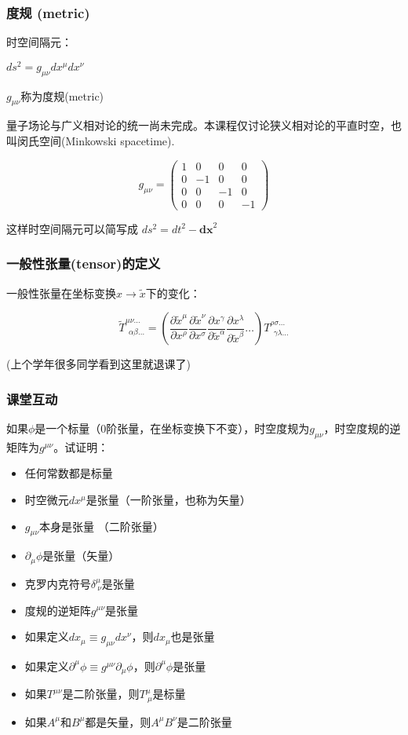 \documentclass[CJK]{beamer}
\begin{document}
\begin{frame}
\frametitle{\bch 度规 (metric) \ech}
\bch 时空间隔元：\ech

$ds^2 = g_{\mu\nu} dx^\mu dx^\nu$

\bch $g_{\mu\nu}$称为度规(metric) \ech

{\vskip 0.1in}

\bch 量子场论与广义相对论的统一尚未完成。本课程仅讨论狭义相对论的平直时空，也叫闵氏空间(Minkowski spacetime). \ech

\begin{equation} 
g_{\mu\nu} =  \left( \begin{array}{rrrr} 1 & 0 & 0 & 0 \\ 0 & -1 & 0 & 0 \\ 0 & 0 & -1 & 0 \\ 0 & 0 & 0 & -1 \end{array} \right) \nonumber
\end{equation}

\bch 这样时空间隔元可以简写成 $ds^2 = dt^2 - \mathbf{dx}^2$ \ech

\end{frame}


\begin{frame}
\frametitle{\bch 一般性张量(tensor)的定义 \ech}
\bch
一般性张量在坐标变换$x \rightarrow \tilde{x}$下的变化：


$$\tilde{T}^{\mu\nu\ldots}_{\ \ \alpha\beta\ldots} = \left(\frac{\partial \tilde{x}^\mu}{\partial x^\rho}\frac{\partial \tilde{x}^\nu}{\partial x^\sigma} \frac{\partial x^\gamma }{\partial \tilde{x}^\alpha}\frac{\partial x^\lambda}{\partial \tilde{x}^\beta} \ldots \right)T^{\rho\sigma\ldots}_{\ \ \gamma\lambda\ldots} $$

\skiplines


(上个学年很多同学看到这里就退课了\bye)
\ech
\end{frame}

\begin{frame}
\frametitle{\bch 课堂互动 \ech}
\bch
如果$\phi$是一个标量（0阶张量，在坐标变换下不变），时空度规为$g_{\mu\nu}$，时空度规的逆矩阵为$g^{\mu\nu}$。试证明：
\begin{itemize}
\item{任何常数都是标量}
\item{时空微元$dx^\mu$是张量（一阶张量，也称为矢量）}
\item{$g_{\mu\nu}$本身是张量 （二阶张量）}
\item{$\partial_\mu\phi$是张量（矢量）}
\item{克罗内克符号$\delta^{\mu}_{\ \nu}$是张量}
\item{度规的逆矩阵$g^{\mu\nu}$是张量}
\item{如果定义$dx_{\mu} \equiv g_{\mu\nu} dx^{\nu}$，则$dx_\mu$也是张量}
\item{如果定义$\partial^\mu\phi \equiv g^{\mu\nu}\partial_\mu\phi$，则$\partial^\mu\phi$是张量}
\item{如果$T^{\mu\nu}$是二阶张量，则$T^{\mu}_{\ \mu}$是标量}
\item{如果$A^{\mu}$和$B^{\mu}$都是矢量，则$A^\mu B^\nu$是二阶张量}
\end{itemize}

\ech
\end{frame}
\end{document}
